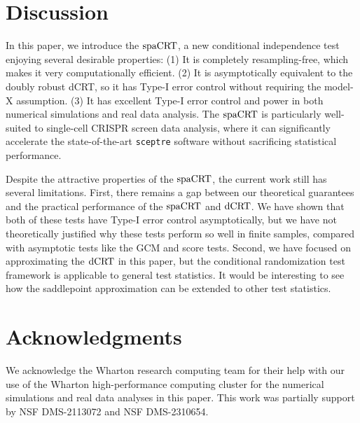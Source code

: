 \documentclass[12pt]{article}
\theoremstyle{definition}
\newcommand{\dCRT}{\textnormal{dCRT}} 					%
\newcommand{\spacrt}{\textnormal{spaCRT}}               %
\begin{document}


\section{Discussion} \label{sec:discussion}

In this paper, we introduce the $\spacrt$, a new conditional independence test enjoying several desirable properties: (1) It is completely resampling-free, which makes it very computationally efficient. (2) It is asymptotically equivalent to the doubly robust dCRT, so it has Type-I error control without requiring the model-X assumption. (3) It has excellent Type-I error control and power in both numerical simulations and real data analysis. The $\spacrt$ is particularly well-suited to single-cell CRISPR screen data analysis, where it can significantly accelerate the state-of-the-art \verb|sceptre| software without sacrificing statistical performance.

Despite the attractive properties of the $\spacrt$, the current work still has several limitations. First, there remains a gap between our theoretical guarantees and the practical performance of the $\spacrt$ and $\dCRT$. We have shown that both of these tests have Type-I error control asymptotically, but we have not theoretically justified why these tests perform so well in finite samples, compared with asymptotic tests like the GCM and score tests. Second, we have focused on approximating the $\dCRT$ in this paper, but the conditional randomization test framework is applicable to general test statistics. It would be interesting to see how the saddlepoint approximation can be extended to other test statistics.

\section{Acknowledgments}

We acknowledge the Wharton research computing team for their help with our use of the Wharton high-performance computing cluster for the numerical simulations and real data analyses in this paper. This work was partially support by NSF DMS-2113072 and NSF DMS-2310654.




\clearpage 

\printbibliography

\clearpage

\appendix
\end{document}

